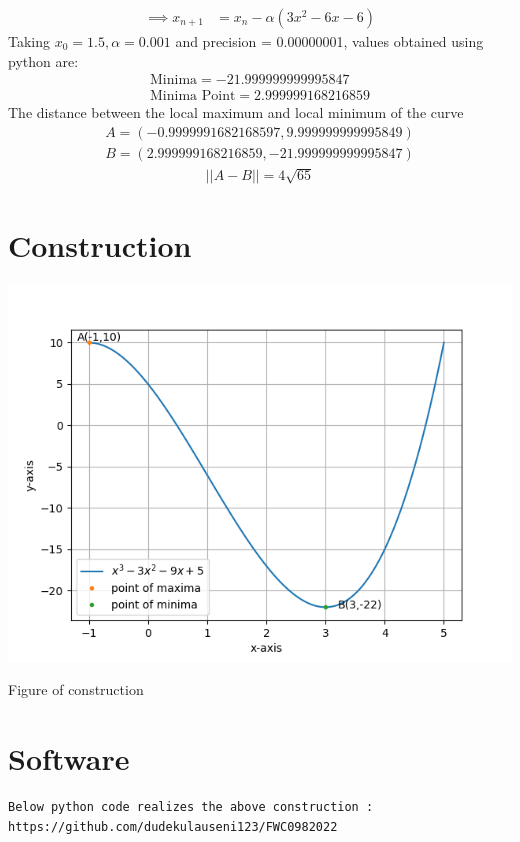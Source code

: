 \documentclass[10pt, a4paper]{article}
\providecommand{\brak}[1]{\ensuremath{\left(#1\right)}}
\begin{document}
 \begin{align}
        \implies x_{n+1} &= x_n - \alpha \brak{3x^2 - 6x - 6}
    \end{align}
Taking $x_0=1.5,\alpha=0.001$ and precision = 0.00000001, values obtained using python are:
    \begin{align}
        \boxed{\text{Minima} = -21.999999999995847}\\
        \boxed{\text{Minima Point} = 2.999999168216859 }
    \end{align}
 The distance between the local maximum and local minimum of the curve\\
 \begin{align}
 A=(-0.9999991682168597 , 9.999999999995849)\\
 B=(2.999999168216859   ,-21.999999999995847)
 \end{align}
 \begin{align}
 ||A-B||=4\sqrt{65}
 \end{align}
 \section{Construction}
  \includegraphics[scale=0.35]{op1.png}
  	\begin{center}
  Figure of construction
  	\end{center}
\section{Software}
\begin{center}
 \begin{lstlisting}
Below python code realizes the above construction :
https://github.com/dudekulauseni123/FWC0982022
 \end{lstlisting}
\end{center}
\end{document}
